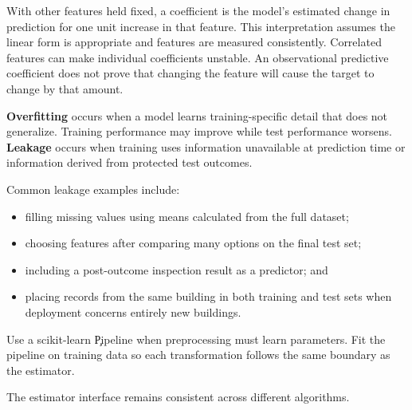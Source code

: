 
With other features held fixed, a coefficient is the model's estimated change
in prediction for one unit increase in that feature. This interpretation assumes
the linear form is appropriate and features are measured consistently. Correlated
features can make individual coefficients unstable. An observational predictive
coefficient does not prove that changing the feature will cause the target to
change by that amount.


\textbf{Overfitting} occurs when a model learns training-specific detail that
does not generalize. Training performance may improve while test performance
worsens. \textbf{Leakage} occurs when training uses information unavailable at
prediction time or information derived from protected test outcomes.

Common leakage examples include:

\begin{itemize}
    \item filling missing values using means calculated from the full dataset;
    \item choosing features after comparing many options on the final test set;
    \item including a post-outcome inspection result as a predictor; and
    \item placing records from the same building in both training and test sets
          when deployment concerns entirely new buildings.
\end{itemize}

Use a scikit-learn \c{Pipeline} when preprocessing must learn parameters. Fit
the pipeline on training data so each transformation follows the same boundary
as the estimator.


The estimator interface remains consistent across different algorithms.

